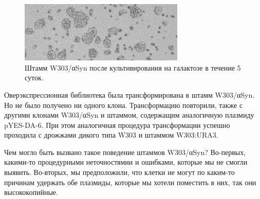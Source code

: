 \begin{figure}[h]
	\centering

	\includegraphics[width = 0.7\textwidth]{pics/16_4_1246_5_nghts_-uraGAL.jpg}
	\caption{Штамм W303/αSyn после культивирования на галактозе в течение 5 суток.}
	\label{fig:division}	
\end{figure}

%
%



Оверэкспрессионная библиотека была трансформирована в штамм  W303/αSyn. Но не было получено ни одного клона. Трансформацию повторили, также с другими клонами W303/αSyn и штаммом, содержащим аналогичную плазмиду pYES-DA-6. При этом аналогичная процедура трансформации успешно проходила с дрожжами дикого типа W303 и штаммом W303:URA3.

Чем могло быть вызвано такое поведение штаммов W303/αSyn? Во-первых, какими-то процедурными неточностямии и ошибками, которые мы не смогли выявить. Во-вторых, мы предположили, что клетки не могут по каким-то причинам удержать обе плазмиды, которые мы хотели поместить в них, так они высококопийные. 


